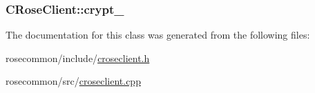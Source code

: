 \subsubsection[{\texorpdfstring{crypt\+\_\+}{crypt_}}]{ C\+Rose\+Client\+::crypt\+\_\+\hspace{0.3cm}{\ttfamily [protected]}}\hypertarget{classCRoseClient_afea481ae3a99baa9398a13024fdea0ef}{}\label{classCRoseClient_afea481ae3a99baa9398a13024fdea0ef}


The documentation for this class was generated from the following files\+:\begin{DoxyCompactItemize}
\item 
rosecommon/include/\hyperlink{croseclient_8h}{croseclient.\+h}\item 
rosecommon/src/\hyperlink{croseclient_8cpp}{croseclient.\+cpp}\end{DoxyCompactItemize}
